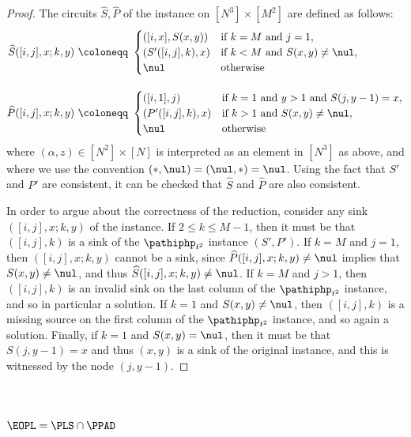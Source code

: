 \begin{proof}
The circuits $\widehat{S}, \widehat{P}$ of the \sopl instance on $[N^3] \times [M^2]$ are defined as follows:
\begin{align*}
    \widehat{S}([i,j],x;k,y)
    &~\coloneqq~
    \begin{cases}
    ([i,x],S(x,y)) & \text{if } k = M \text{ and } j = 1,\\
    (S'([i,j],k),x) & \text{if } k < M \text{ and } S(x,y) \neq \nul,\\
    \nul & \text{otherwise}
    \end{cases} \\[1em]
    \widehat{P}([i,j],x;k,y)
    &~\coloneqq~
    \begin{cases}
    ([i,1],j) & \text{if } k = 1 \text{ and } y > 1 \text{ and } S(j,y-1) = x,\\
    (P'([i,j],k),x) & \text{if } k > 1 \text{ and } S(x,y) \neq \nul,\\
    \nul & \text{otherwise}
    \end{cases}
\end{align*}
where $(\alpha,z) \in [N^2] \times [N]$ is interpreted as an element in $[N^3]$ as above, and where we use the convention $(\ast,\nul) = (\nul,\ast) = \nul$. Using the fact that $S'$ and $P'$ are consistent, it can be checked that $\widehat{S}$ and $\widehat{P}$ are also consistent.

In order to argue about the correctness of the reduction, consider any sink $([i,j],x;k,y)$ of the \sopl instance. If $2 \leq k \leq M-1$, then it must be that $([i,j],k)$ is a sink of the $\pathiphp_{t^2}$ instance $(S',P')$. If $k = M$ and $j = 1$, then $([i,j],x;k,y)$ cannot be a sink, since $\widehat{P}([i,j],x;k,y) \neq \nul$ implies that $S(x,y) \neq \nul$, and thus $\widehat{S}([i,j],x;k,y) \neq \nul$. If $k = M$ and $j > 1$, then $([i,j],k)$ is an invalid sink on the last column of the $\pathiphp_{t^2}$ instance, and so in particular a solution. If $k = 1$ and $S(x,y) \neq \nul$, then $([i,j],k)$ is a missing source on the first column of the $\pathiphp_{t^2}$ instance, and so again a solution. Finally, if $k = 1$ and $S(x,y) = \nul$, then it must be that $S(j,y-1) = x$ and thus $(x,y)$ is a sink of the original \sod instance, and this is witnessed by the node $(j,y-1)$.
\end{proof}

\section{\texorpdfstring{$\EOPL = \PLS\cap\PPAD$}{EOPL = PLS \cap PPAD}}

